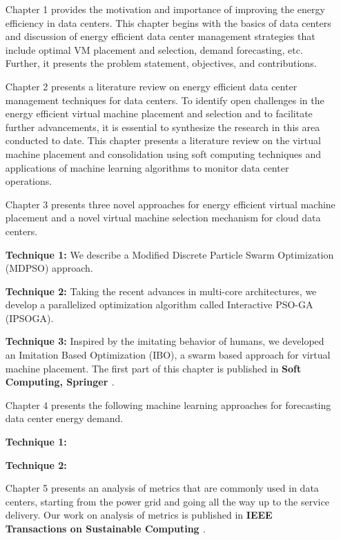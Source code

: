 \documentclass[review]{elsarticle}
\begin{document}
\begin{itemize}
	\item[Chapter 1] provides the motivation and importance of improving the energy efficiency in data centers. This chapter begins with the basics of data centers and discussion of energy efficient data center management strategies that include optimal VM placement and selection, demand forecasting, etc. Further, it presents the problem statement, objectives, and contributions. 
	
	\item[Chapter 2] presents a literature review on energy efficient data center management techniques for data centers. To identify open challenges in the energy
	efficient virtual machine placement and selection and to facilitate further advancements, it is essential to synthesize the research in this area conducted to date. This chapter presents a literature review on the virtual machine placement and consolidation using soft computing techniques and applications of machine learning algorithms to monitor data center operations.
	
	\item[Chapter 3] presents three novel approaches for energy efficient virtual machine placement and a novel virtual machine selection mechanism for cloud data centers.
	
	\textbf{Technique 1:}  We describe a Modified Discrete Particle Swarm Optimization (MDPSO) approach.
	
	\textbf{Technique 2:}
	Taking the recent advances in multi-core architectures, we develop a parallelized optimization algorithm called Interactive PSO-GA (IPSOGA).
	
	\textbf{Technique 3:}
	Inspired by the imitating behavior of humans, we developed an Imitation Based Optimization (IBO), a swarm based approach for virtual machine placement. 	
	The first part of this chapter is published in \textbf{Soft Computing, Springer \cite{DineshReddy2017}}.
	
	
	\item[Chapter 4] presents the following machine learning approaches for forecasting data center energy demand. 
	
	\textbf{Technique 1:}

	
	\textbf{Technique 2:} 
	
	
	\item[Chapter 5] presents an analysis of metrics that are commonly used in data centers, starting from the power grid and going all the way up to the service delivery.  Our work on analysis of metrics is published in \textbf{IEEE Transactions on Sustainable Computing \cite{tsusc}}.
	

\end{itemize}
\end{document}
